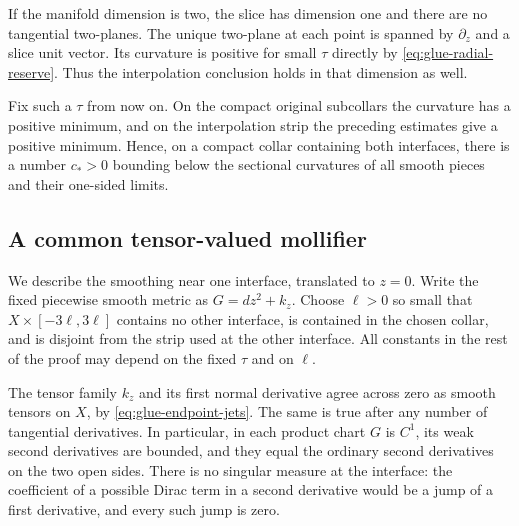 \documentclass[12pt]{amsart}
\numberwithin{equation}{section}
\theoremstyle{remark}
\begin{document}
If the manifold dimension is two, the slice has dimension one
and there are no tangential two-planes. The unique two-plane at
each point is spanned by \(\partial_z\) and a slice unit vector.
Its curvature is positive for small \(\tau\) directly by
\eqref{eq:glue-radial-reserve}. Thus the interpolation conclusion
holds in that dimension as well.

Fix such a \(\tau\) from now on. On the compact original
subcollars the curvature has a positive minimum, and on the
interpolation strip the preceding estimates give a positive
minimum. Hence, on a compact collar containing both interfaces,
there is a number \(c_*>0\) bounding below the sectional
curvatures of all smooth pieces and their one-sided limits.

\subsection{A common tensor-valued mollifier}
We describe the smoothing near one interface, translated to
\(z=0\). Write the fixed piecewise smooth metric as
\(G=dz^2+k_z\). Choose \(\ell>0\) so small that
\(X\times[-3\ell,3\ell]\) contains no other interface, is
contained in the chosen collar, and is disjoint from the strip
used at the other interface. All constants in the rest of the
proof may depend on the fixed \(\tau\) and on \(\ell\).

The tensor family \(k_z\) and its first normal derivative agree
across zero as smooth tensors on \(X\), by
\eqref{eq:glue-endpoint-jets}. The same is true after any number
of tangential derivatives. In particular, in each product chart
\(G\) is \(C^1\), its weak second derivatives are bounded,
and they equal the ordinary second derivatives on the two open
sides. There is no singular measure at the interface: the
coefficient of a possible Dirac term in a second derivative
would be a jump of a first derivative, and every such jump is
zero.
\end{document}
